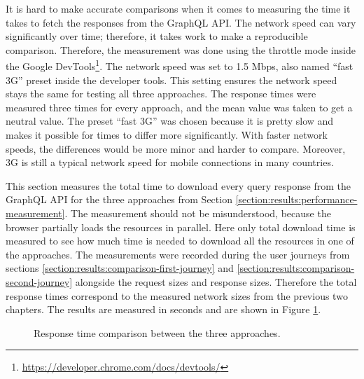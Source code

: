 It is hard to make accurate comparisons when it comes to measuring the time it takes to fetch the responses from the GraphQL \ac{API}. The network speed can vary significantly over time; therefore, it takes work to make a reproducible comparison. Therefore, the measurement was done using the throttle mode inside the Google DevTools\footnote{\url{https://developer.chrome.com/docs/devtools/}}. The network speed was set to 1.5 Mbps, also named \enquote{fast 3G} preset inside the developer tools. This setting ensures the network speed stays the same for testing all three approaches. The response times were measured three times for every approach, and the mean value was taken to get a neutral value. The preset \enquote{fast 3G} was chosen because it is pretty slow and makes it possible for times to differ more significantly. With faster network speeds, the differences would be more minor and harder to compare. Moreover, 3G is still a typical network speed for mobile connections in many countries.

\bigskip

\noindent This section measures the total time to download every query response from the GraphQL \ac{API} for the three approaches from Section \ref{section:results:performance-measurement}. The measurement should not be misunderstood, because the browser partially loads the resources in parallel. Here only total download time is measured to see how much time is needed to download all the resources in one of the approaches. The measurements were recorded during the user journeys from sections \ref{section:results:comparison-first-journey} and \ref{section:results:comparison-second-journey} alongside the request sizes and response sizes. Therefore the total response times correspond to the measured network sizes from the previous two chapters. The results are measured in seconds and are shown in Figure \ref{fig:discussion:response-times}. 

\begin{figure}[H]
  \centering
  \caption{Response time comparison between the three approaches.}\label{fig:discussion:response-times}
\end{figure}

